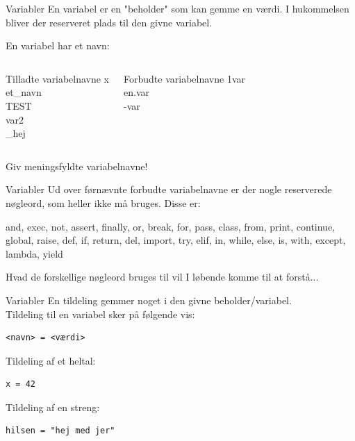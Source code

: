 \documentclass[10pt]{beamer}
\begin{document}
\begin{frame}{Variabler}
En variabel er en "beholder" som kan gemme en værdi. I hukommelsen bliver der reserveret plads til den givne variabel.


En variabel har et navn:
	\begin{columns}
		\begin{exampleblock}{Tilladte variabelnavne}
		x\\et\_navn\\TEST\\var2\\\_hej
		\end{exampleblock}

		\begin{alertblock}{Forbudte variabelnavne}
		1var\\en.var\\-var
		\end{alertblock}
	\end{columns}
	\vfill
	Giv meningsfyldte variabelnavne!
\end{frame}

\begin{frame}{Variabler}
	Ud over førnævnte forbudte variabelnavne er der nogle reserverede nøgleord, som heller ikke må bruges.
	\vfill
	Disse er: \\
		\begin{Large}
			and, exec, not, assert,	finally, or, break, for, pass, class, from, print, continue, global, raise, def, if, return, del, import, try, elif, in, while, else, is, with, except, lambda,	yield		
		\end{Large}
	\vfill
	Hvad de forskellige nøgleord bruges til vil I løbende komme til at forstå...
\end{frame}

\begin{frame}[fragile]{Variabler}
	En tildeling gemmer noget i den givne beholder/variabel.\\
	Tildeling til en variabel sker på følgende vis:
	\begin{lstlisting}[style=python]
<navn> = <værdi>
	\end{lstlisting}
	Tildeling af et heltal:
	\begin{lstlisting}[style=python]
x = 42
	\end{lstlisting}
	Tildeling af en streng:
	\begin{lstlisting}[style=python]
hilsen = "hej med jer"
	\end{lstlisting}
\end{frame}
\end{document}
